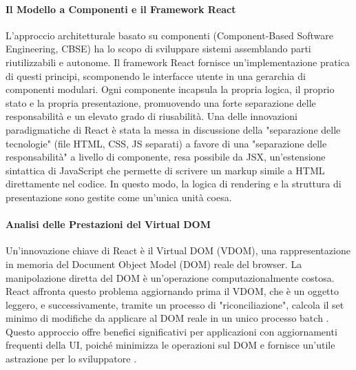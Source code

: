 \documentclass[12pt,a4paper,openright,twoside]{book}
\begin{document}
\paragraph{Il Modello a Componenti e il Framework React}
L'approccio architetturale basato su componenti (Component-Based Software Engineering, CBSE) ha lo scopo di sviluppare sistemi assemblando parti riutilizzabili e autonome. Il framework React fornisce un'implementazione pratica di questi principi, scomponendo le interfacce utente in una gerarchia di componenti modulari. Ogni componente incapsula la propria logica, il proprio stato e la propria presentazione, promuovendo una forte separazione delle responsabilità e un elevato grado di riusabilità. Una delle innovazioni paradigmatiche di React è stata la messa in discussione della "separazione delle tecnologie" (file HTML, CSS, JS separati) a favore di una "separazione delle responsabilità" a livello di componente, resa possibile da JSX, un'estensione sintattica di JavaScript che permette di scrivere un markup simile a HTML direttamente nel codice. In questo modo, la logica di rendering e la struttura di presentazione sono gestite come un'unica unità coesa.

\paragraph{Analisi delle Prestazioni del Virtual DOM}
Un'innovazione chiave di React è il Virtual DOM (VDOM), una rappresentazione in memoria del Document Object Model (DOM) reale del browser. La manipolazione diretta del DOM è un'operazione computazionalmente costosa. React affronta questo problema aggiornando prima il VDOM, che è un oggetto leggero, e successivamente, tramite un processo di "riconciliazione", calcola il set minimo di modifiche da applicare al DOM reale in un unico processo batch \cite{chen2019performance}. Questo approccio offre benefici significativi per applicazioni con aggiornamenti frequenti della UI, poiché minimizza le operazioni sul DOM e fornisce un'utile astrazione per lo sviluppatore \cite{chen2019performance}.
\end{document}
